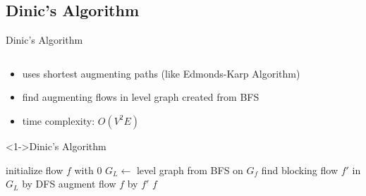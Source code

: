 \documentclass[aspectratio=169,c]{beamer} %
\begin{document}
\subsection*{Dinic's Algorithm}
\begin{frame}{Dinic's Algorithm}
    \begin{columns}[c]
        \begin{column}{0.8\textwidth}
            \begin{itemize}
                \item uses shortest augmenting paths (like Edmonds-Karp Algorithm)
                \item find augmenting flows in level graph created from BFS
                \item time complexity: \(O(V^2E)\)
            \end{itemize}
            \begin{block}<1->{Dinic's Algorithm}
                \begin{algorithmic}
                    \STATE initialize flow \(f\) with 0
                    \STATE \(G_L\gets\) {\color{red}level graph} from BFS on \(G_f\)
                    \STATE find {\color{red}blocking flow} \(f'\) in \(G_L\) by DFS
                    \STATE augment flow \(f\) by \(f'\)
                    \ENDWHILE
                    \RETURN \(f\)
                \end{algorithmic}
            \end{block}
        \end{column}
    \end{columns}
\end{frame}
\end{document}
